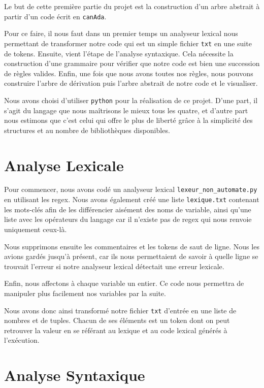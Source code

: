\documentclass[11pt]{article}
\begin{document}
Le but de cette première partie du projet est la construction d'un arbre abstrait à partir d'un code écrit en \texttt{canAda}. 

Pour ce faire, il nous faut dans un premier temps un analyseur lexical nous permettant de transformer notre code qui est un simple fichier \texttt{txt} en une suite de tokens. Ensuite, vient l'étape de l'analyse syntaxique. Cela nécessite la construction d'une grammaire pour vérifier que notre code est bien une succession de règles valides. Enfin, une fois que nous avons toutes nos règles, nous pouvons construire l'arbre de dérivation puis l'arbre abstrait de notre code et le visualiser.

Nous avons choisi d'utiliser \texttt{python} pour la réalisation de ce projet. D'une part, il s'agit du langage que nous maîtrisons le mieux tous les quatre, et d'autre part nous estimons que c'est celui qui offre le plus de liberté grâce à la simplicité des structures et au nombre de bibliothèques disponibles.

\section{Analyse Lexicale}

Pour commencer, nous avons codé un analyseur lexical \texttt{lexeur\_non\_automate.py} en utilisant les regex. Nous avons également créé une liste \texttt{lexique.txt} contenant les mots-clés afin de les différencier aisément des noms de variable, ainsi qu'une liste avec les opérateurs du langage car il n'existe pas de regex qui nous renvoie uniquement ceux-là.

Nous supprimons ensuite les commentaires et les tokens de saut de ligne. Nous les avions gardés jusqu'à présent, car ils nous permettaient de savoir à quelle ligne se trouvait l'erreur si notre analyseur lexical détectait une erreur lexicale.

Enfin, nous affectons à chaque variable un entier. Ce code nous permettra de manipuler plus facilement nos variables par la suite.

Nous avons donc ainsi transformé notre fichier \texttt{txt} d'entrée en une liste de nombres et de tuples. Chacun de ses éléments est un token dont on peut retrouver la valeur en se référant au lexique et au code lexical générés à l'exécution.

\section{Analyse Syntaxique}
\end{document}
